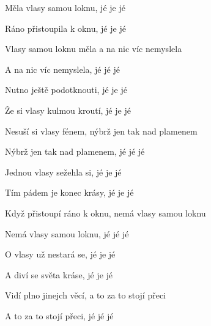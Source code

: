 \begin{song}


\begin{hchordbox}
\end{hchordbox}

\Large

\bigskip

Měla vlasy samou loknu, jé je jé \par
{}Ráno přistoupila k oknu, jé je jé \par
{}Vlasy samou loknu měla a na nic víc nemyslela \par
{}A na nic víc nemyslela, jé jé jé \par

\bigskip


\bigskip

Nutno ještě podotknouti, jé je jé \par
{}Že si vlasy kulmou kroutí, jé je jé \par
{}Nesuší si vlasy fénem, nýbrž jen tak nad plamenem \par
{}Nýbrž jen tak nad plamenem, jé jé jé \par

\bigskip


\bigskip

Jednou vlasy sežehla si, jé je jé \par
{}Tím pádem je konec krásy, jé je jé \par
{}Když přistoupí ráno k oknu, nemá vlasy samou loknu \par
{}Nemá vlasy samou loknu, jé jé jé \par

\bigskip


\bigskip

O vlasy už nestará se, jé je jé \par
{}A diví se světa kráse, jé je jé \par
{}Vidí plno jinejch věcí, a to za to stojí přeci \par
{}A to za to stojí přeci, jé jé jé \par


\end{song}
